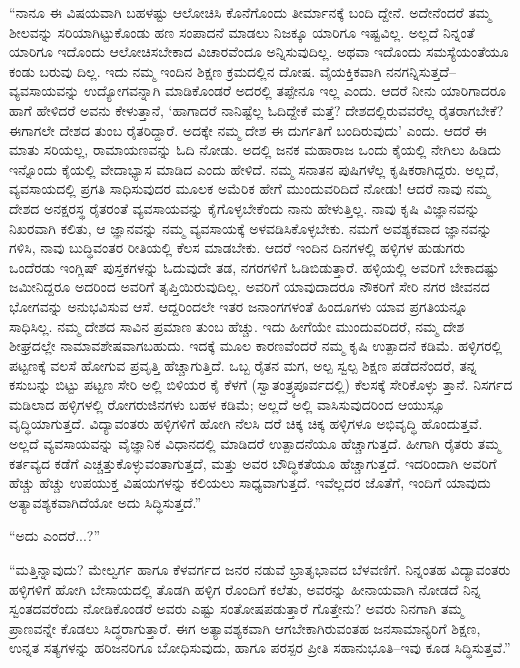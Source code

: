 “ನಾನೂ ಈ ವಿಷಯವಾಗಿ ಬಹಳಷ್ಟು ಆಲೋಚಿಸಿ ಕೊನೆಗೊಂದು ತೀರ್ಮಾನಕ್ಕೆ ಬಂದಿ ದ್ದೇನೆ. ಅದೇನೆಂದರೆ ತಮ್ಮ ಶೀಲವನ್ನು ಸರಿಯಾಗಿಟ್ಟುಕೊಂಡು ಹಣ ಸಂಪಾದನೆ ಮಾಡಲು ನಿಜಕ್ಕೂ ಯಾರಿಗೂ ಇಷ್ಟವಿಲ್ಲ. ಅಲ್ಲದೆ ನಿನ್ನಂತೆ ಯಾರಿಗೂ ಇದೊಂದು ಆಲೋಚಿಸಬೇಕಾದ ವಿಚಾರವೆಂದೂ ಅನ್ನಿಸುವುದಿಲ್ಲ. ಅಥವಾ ಇದೊಂದು ಸಮಸ್ಯೆಯಂತೆಯೂ ಕಂಡು ಬರುವು ದಿಲ್ಲ. ಇದು ನಮ್ಮ ಇಂದಿನ ಶಿಕ್ಷಣ ಕ್ರಮದಲ್ಲಿನ ದೋಷ. ವೈಯಕ್ತಿಕವಾಗಿ ನನಗನ್ನಿಸುತ್ತದೆ– ವ್ಯವಸಾಯವನ್ನು ಉದ್ಯೋಗವನ್ನಾಗಿ ಮಾಡಿಕೊಂಡರೆ ಅದರಲ್ಲಿ ತಪ್ಪೇನೂ ಇಲ್ಲ ಎಂದು. ಆದರೆ ನೀನು ಯಾರಿಗಾದರೂ ಹಾಗೆ ಹೇಳಿದರೆ ಅವನು ಕೇಳುತ್ತಾನೆ, ‘ಹಾಗಾದರೆ ನಾನಿಷ್ಟೆಲ್ಲ ಓದಿದ್ದೇಕೆ ಮತ್ತೆ? ದೇಶದಲ್ಲಿರುವವರೆಲ್ಲ ರೈತರಾಗಬೇಕೆ? ಈಗಾಗಲೇ ದೇಶದ ತುಂಬ ರೈತರಿದ್ದಾರೆ. ಅದಕ್ಕೇ ನಮ್ಮ ದೇಶ ಈ ದುರ್ಗತಿಗೆ ಬಂದಿರುವುದು’ ಎಂದು. ಆದರೆ ಈ ಮಾತು ಸರಿಯಲ್ಲ, ರಾಮಾಯಣವನ್ನು ಓದಿ ನೋಡು. ಅದಲ್ಲಿ ಜನಕ ಮಹಾರಾಜ ಒಂದು ಕೈಯಲ್ಲಿ ನೇಗಿಲು ಹಿಡಿದು ಇನ್ನೊಂದು ಕೈಯಲ್ಲಿ ವೇದಾಭ್ಯಾಸ ಮಾಡಿದ ಎಂದು ಹೇಳಿದೆ. ನಮ್ಮ ಸನಾತನ ಪುಷಿಗಳೆಲ್ಲ ಕೃಷಿಕರಾಗಿದ್ದರು. ಅಲ್ಲದೆ, ವ್ಯವಸಾಯದಲ್ಲಿ ಪ್ರಗತಿ ಸಾಧಿಸುವುದರ ಮೂಲಕ ಅಮೆರಿಕ ಹೇಗೆ ಮುಂದುವರಿದಿದೆ ನೋಡು! ಆದರೆ ನಾವು ನಮ್ಮ ದೇಶದ ಅನಕ್ಷರಸ್ಥ ರೈತರಂತೆ ವ್ಯವಸಾಯವನ್ನು ಕೈಗೊಳ್ಳಬೇಕೆಂದು ನಾನು ಹೇಳುತ್ತಿಲ್ಲ. ನಾವು ಕೃಷಿ ವಿಜ್ಞಾನವನ್ನು ನಿಖರವಾಗಿ ಕಲಿತು, ಆ ಜ್ಞಾನವನ್ನು ನಮ್ಮ ವ್ಯವಸಾಯಕ್ಕೆ ಅಳವಡಿಸಿಕೊಳ್ಳಬೇಕು. ನಮಗೆ ಅವಶ್ಯಕವಾದ ಜ್ಞಾನವನ್ನು ಗಳಿಸಿ, ನಾವು ಬುದ್ಧಿವಂತರ ರೀತಿಯಲ್ಲಿ ಕೆಲಸ ಮಾಡಬೇಕು. ಆದರೆ ಇಂದಿನ ದಿನಗಳಲ್ಲಿ ಹಳ್ಳಿಗಳ ಹುಡುಗರು ಒಂದೆರಡು ಇಂಗ್ಲಿಷ್ ಪುಸ್ತಕಗಳನ್ನು ಓದುವುದೇ ತಡ, ನಗರಗಳಿಗೆ ಓಡಿಬಿಡುತ್ತಾರೆ. ಹಳ್ಳಿಯಲ್ಲಿ ಅವರಿಗೆ ಬೇಕಾದಷ್ಟು ಜಮೀನಿದ್ದರೂ ಅದರಿಂದ ಅವರಿಗೆ ತೃಪ್ತಿಯಿರುವುದಿಲ್ಲ. ಅವರಿಗೆ ಯಾವುದಾದರೂ ನೌಕರಿಗೆ ಸೇರಿ ನಗರ ಜೀವನದ ಭೋಗವನ್ನು ಅನುಭವಿಸುವ ಆಸೆ. ಆದ್ದರಿಂದಲೇ ಇತರ ಜನಾಂಗಗಳಂತೆ ಹಿಂದೂಗಳು ಯಾವ ಪ್ರಗತಿಯನ್ನೂ ಸಾಧಿಸಿಲ್ಲ. ನಮ್ಮ ದೇಶದ ಸಾವಿನ ಪ್ರಮಾಣ ತುಂಬ ಹೆಚ್ಚು. ಇದು ಹೀಗೆಯೇ ಮುಂದುವರಿದರೆ, ನಮ್ಮ ದೇಶ ಶೀಘ್ರದಲ್ಲೇ ನಾಮಾವಶೇಷವಾಗಬಹುದು. ಇದಕ್ಕೆ ಮೂಲ ಕಾರಣವೆಂದರೆ ನಮ್ಮ ಕೃಷಿ ಉತ್ಪಾದನೆ ಕಡಿಮೆ. ಹಳ್ಳಿಗರಲ್ಲಿ ಪಟ್ಟಣಕ್ಕೆ ವಲಸೆ ಹೋಗುವ ಪ್ರವೃತ್ತಿ ಹೆಚ್ಚಾಗುತ್ತಿದೆ. ಒಬ್ಬ ರೈತನ ಮಗ, ಅಲ್ಪ ಸ್ವಲ್ಪ ಶಿಕ್ಷಣ ಪಡೆದನೆಂದರೆ, ತನ್ನ ಕಸುಬನ್ನು ಬಿಟ್ಟು ಪಟ್ಟಣ ಸೇರಿ ಅಲ್ಲಿ ಬಿಳಿಯರ ಕೈ ಕೆಳಗೆ (ಸ್ವಾತಂತ್ರ್ಯಪೂರ್ವದಲ್ಲಿ) ಕೆಲಸಕ್ಕೆ ಸೇರಿಕೊಳ್ಳು ತ್ತಾನೆ. ನಿಸರ್ಗದ ಮಡಿಲಾದ ಹಳ್ಳಿಗಳಲ್ಲಿ ರೋಗರುಜಿನಗಳು ಬಹಳ ಕಡಿಮೆ; ಅಲ್ಲದೆ ಅಲ್ಲಿ ವಾಸಿಸುವುದರಿಂದ ಆಯುಸ್ಸೂ ವೃದ್ಧಿಯಾಗುತ್ತದೆ. ವಿದ್ಯಾವಂತರು ಹಳ್ಳಿಗಳಿಗೆ ಹೋಗಿ ನೆಲಸಿ ದರೆ ಚಿಕ್ಕ ಚಿಕ್ಕ ಹಳ್ಳಿಗಳೂ ಅಭಿವೃದ್ಧಿ ಹೊಂದುತ್ತವೆ. ಅಲ್ಲದೆ ವ್ಯವಸಾಯವನ್ನು ವೈಜ್ಞಾನಿಕ ವಿಧಾನದಲ್ಲಿ ಮಾಡಿದರೆ ಉತ್ಪಾದನೆಯೂ ಹೆಚ್ಚಾಗುತ್ತದೆ. ಹೀಗಾಗಿ ರೈತರು ತಮ್ಮ ಕರ್ತವ್ಯದ ಕಡೆಗೆ ಎಚ್ಚತ್ತುಕೊಳ್ಳುವಂತಾಗುತ್ತದೆ, ಮತ್ತು ಅವರ ಬೌದ್ಧಿಕತೆಯೂ ಹೆಚ್ಚಾಗುತ್ತದೆ. ಇದರಿಂದಾಗಿ ಅವರಿಗೆ ಹೆಚ್ಚು ಹೆಚ್ಚು ಉಪಯುಕ್ತ ವಿಷಯಗಳನ್ನು ಕಲಿಯಲು ಸಾಧ್ಯವಾಗುತ್ತದೆ. ಇವೆಲ್ಲದರ ಜೊತೆಗೆ, ಇಂದಿಗೆ ಯಾವುದು ಅತ್ಯಾವಶ್ಯಕವಾಗಿದೆಯೋ ಅದು ಸಿದ್ಧಿಸುತ್ತದೆ.”

“ಅದು ಎಂದರೆ...?”

“ಮತ್ತಿನ್ನಾವುದು? ಮೇಲ್ವರ್ಗ ಹಾಗೂ ಕೆಳವರ್ಗದ ಜನರ ನಡುವೆ ಭ್ರಾತೃಭಾವದ ಬೆಳವಣಿಗೆ. ನಿನ್ನಂತಹ ವಿದ್ಯಾವಂತರು ಹಳ್ಳಿಗಳಿಗೆ ಹೋಗಿ ಬೇಸಾಯದಲ್ಲಿ ತೊಡಗಿ ಹಳ್ಳಿಗ ರೊಂದಿಗೆ ಕಲೆತು, ಅವರನ್ನು ಹೀನಾಯವಾಗಿ ನೋಡದೆ ನಿನ್ನ ಸ್ವಂತದವರೆಂದು ನೋಡಿಕೊಂಡರೆ ಅವರು ಎಷ್ಟು ಸಂತೋಷಪಡುತ್ತಾರೆ ಗೊತ್ತೇನು? ಅವರು ನಿನಗಾಗಿ ತಮ್ಮ ಪ್ರಾಣವನ್ನೇ ಕೊಡಲು ಸಿದ್ಧರಾಗುತ್ತಾರೆ. ಈಗ ಅತ್ಯಾವಶ್ಯಕವಾಗಿ ಆಗಬೇಕಾಗಿರುವಂತಹ ಜನಸಾಮಾನ್ಯರಿಗೆ ಶಿಕ್ಷಣ, ಉನ್ನತ ಸತ್ಯಗಳನ್ನು ಹರಿಜನರಿಗೂ ಬೋಧಿಸುವುದು, ಹಾಗೂ ಪರಸ್ಪರ ಪ್ರೀತಿ ಸಹಾನುಭೂತಿ–ಇವು ಕೂಡ ಸಿದ್ಧಿಸುತ್ತವೆ.”

